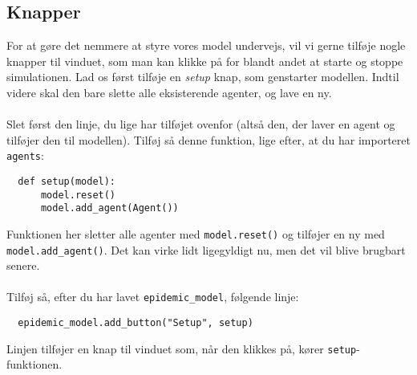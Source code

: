 \documentclass{article}
\begin{document}
\subsection{Knapper}
For at gøre det nemmere at styre vores model undervejs, vil vi gerne tilføje nogle knapper til vinduet, som man kan klikke på for blandt andet at starte og stoppe simulationen. Lad os først tilføje en \textit{setup} knap, som genstarter modellen. Indtil videre skal den bare slette alle eksisterende agenter, og lave en ny.\\\\
Slet først den linje, du lige har tilføjet ovenfor (altså den, der laver en agent og tilføjer den til modellen). Tilføj så denne funktion, lige efter, at du har importeret \texttt{agents}:
\begin{lstlisting}
  def setup(model):
      model.reset()
      model.add_agent(Agent())
\end{lstlisting}
Funktionen her sletter alle agenter med \texttt{model.reset()} og tilføjer en ny med \texttt{model.add\_agent()}. Det kan virke lidt ligegyldigt nu, men det vil blive brugbart senere.\\\\
Tilføj så, efter du har lavet \texttt{epidemic\_model}, følgende linje:
\begin{lstlisting}
  epidemic_model.add_button("Setup", setup)
\end{lstlisting}
Linjen tilføjer en knap til vinduet som, når den klikkes på, kører \texttt{setup}-funktionen.
\end{document}
